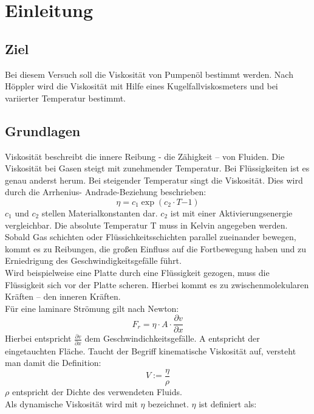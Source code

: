 \chapter{Einleitung}
\section{Ziel}
Bei diesem Versuch soll die Viskosität von Pumpenöl bestimmt werden. Nach Höppler wird die Viskosität mit Hilfe eines Kugelfallviskosmeters und bei variierter Temperatur bestimmt.
\section{Grundlagen}
Viskosität beschreibt die innere Reibung - die Zähigkeit – von Fluiden. Die Viskosität bei Gasen steigt mit zunehmender Temperatur. Bei Flüssigkeiten ist es genau anderst herum. Bei steigender Temperatur singt die Viskosität. Dies wird durch die Arrhenius- Andrade-Beziehung beschrieben: \\
\begin{equation}
\eta =c_1 \exp (c_2\cdot T{-1})
\end{equation}
$c_1$ und $c_2$ stellen Materialkonstanten dar. $c_2$ ist mit einer Aktivierungsenergie vergleichbar. Die absolute Temperatur T muss in Kelvin angegeben werden.\\
Sobald Gas schichten oder Flüssichkeitsschichten parallel zueinander bewegen, kommt es zu Reibungen, die großen Einfluss auf die Fortbewegung haben und zu Erniedrigung des Geschwindigkeitsgefälle führt.\\
Wird beispielweise eine Platte durch eine Flüssigkeit gezogen, muss die Flüssigkeit sich vor der Platte scheren. Hierbei kommt es zu zwischenmolekularen Kräften – den inneren Kräften. \\
Für eine laminare Strömung gilt nach Newton: \\
\begin{equation}
F_r = \eta \cdot A \cdot \frac{\partial v}{\partial x}
\end{equation}
Hierbei entspricht $\frac{\partial v}{\partial x}$ dem Geschwindichkeitsgefälle. A entspricht der eingetauchten Fläche.
Taucht der Begriff kinematische Viskosität auf,  versteht man damit die Definition:\\
\begin{equation}
V:=\frac{\eta}{\rho}
\end{equation}
$\rho$ entspricht der Dichte des verwendeten Fluids.\\
Als dynamische Viskosität wird mit $\eta$ bezeichnet. $\eta$ ist definiert als:\\
